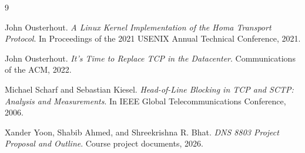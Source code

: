 \documentclass[11pt]{article}
\begin{document}
\begin{thebibliography}{9}

John Ousterhout.
\newblock \emph{A Linux Kernel Implementation of the Homa Transport Protocol}.
\newblock In Proceedings of the 2021 USENIX Annual Technical Conference, 2021.

John Ousterhout.
\newblock \emph{It's Time to Replace TCP in the Datacenter}.
\newblock Communications of the ACM, 2022.

Michael Scharf and Sebastian Kiesel.
\newblock \emph{Head-of-Line Blocking in TCP and SCTP: Analysis and Measurements}.
\newblock In IEEE Global Telecommunications Conference, 2006.

Xander Yoon, Shabib Ahmed, and Shreekrishna R. Bhat.
\newblock \emph{DNS 8803 Project Proposal and Outline}.
\newblock Course project documents, 2026.

\end{thebibliography}
\end{document}
